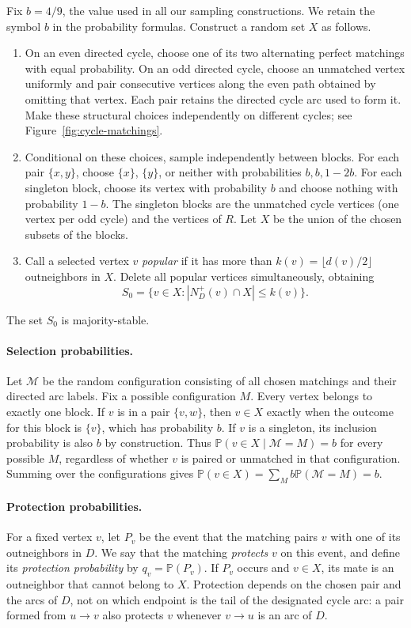 \documentclass[10pt,a4paper]{article}
\newcommand{\Pp}{\mathbb P}
\newcommand{\abs}[1]{|#1|}
\begin{document}
Fix \(b=4/9\), the value used in all our sampling constructions. We retain the symbol \(b\) in the probability formulas. Construct a random set \(X\) as follows.
\begin{enumerate}
\item On an even directed cycle, choose one of its two alternating perfect matchings with equal probability. On an odd directed cycle, choose an unmatched vertex uniformly and pair consecutive vertices along the even path obtained by omitting that vertex. Each pair retains the directed cycle arc used to form it. Make these structural choices independently on different cycles; see Figure~\ref{fig:cycle-matchings}.
\item Conditional on these choices, sample independently between blocks. For each pair \(\{x,y\}\), choose \(\{x\}\), \(\{y\}\), or neither with probabilities \(b,b,1-2b\). For each singleton block, choose its vertex with probability \(b\) and choose nothing with probability \(1-b\). The singleton blocks are the unmatched cycle vertices (one vertex per odd cycle) and the vertices of \(R\). Let \(X\) be the union of the chosen subsets of the blocks.
\item Call a selected vertex \(v\) \emph{popular} if it has more than \(k(v) = \lfloor d(v)/2 \rfloor\) outneighbors in \(X\). Delete all popular vertices simultaneously, obtaining
\begin{equation}\label{eq:deletion}
S_0=\{v\in X:\abs{N_D^+(v)\cap X}\le k(v)\}.
\end{equation}
\end{enumerate}
The set \(S_0\) is majority-stable.

\paragraph{Selection probabilities.}
Let \(\mathcal M\) be the random configuration consisting of all chosen matchings and their directed arc labels. Fix a possible configuration \(M\). Every vertex belongs to exactly one block. If \(v\) is in a pair \(\{v,w\}\), then \(v\in X\) exactly when the outcome for this block is \(\{v\}\), which has probability \(b\). If \(v\) is a singleton, its inclusion probability is also \(b\) by construction. Thus \(\Pp(v\in X\mid\mathcal M=M)=b\) for every possible \(M\), regardless of whether \(v\) is paired or unmatched in that configuration. Summing over the configurations gives \(\Pp(v\in X)=\sum_M b\Pp(\mathcal M=M)=b\).

\paragraph{Protection probabilities.}
For a fixed vertex \(v\), let \(P_v\) be the event that the matching pairs \(v\) with one of its outneighbors in \(D\). We say that the matching \emph{protects} \(v\) on this event, and define its \emph{protection probability} by \(q_v=\Pp(P_v)\). If \(P_v\) occurs and \(v\in X\), its mate is an outneighbor that cannot belong to \(X\). Protection depends on the chosen pair and the arcs of \(D\), not on which endpoint is the tail of the designated cycle arc: a pair formed from \(u\to v\) also protects \(v\) whenever \(v\to u\) is an arc of \(D\).
\end{document}
